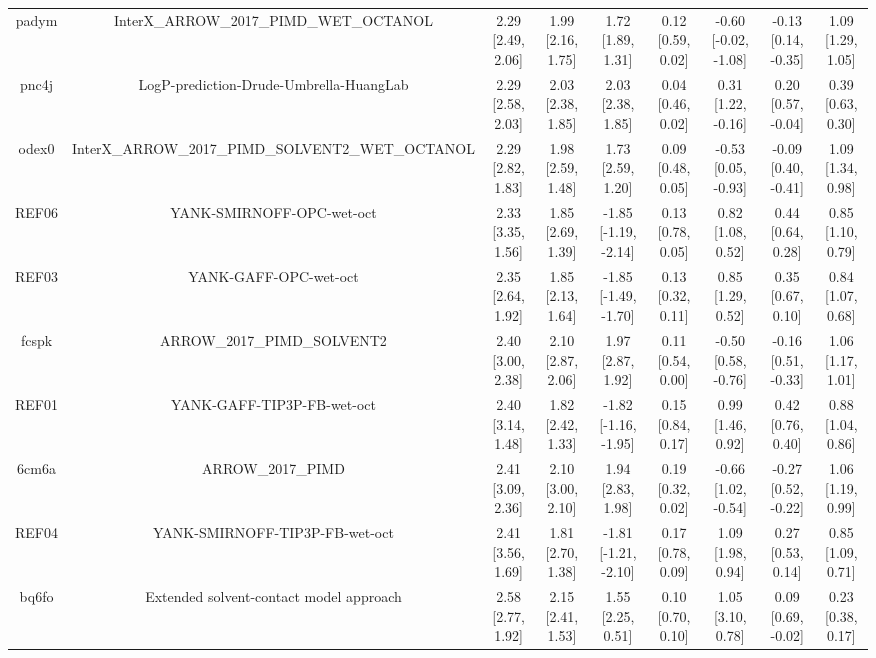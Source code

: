 \documentclass{article}
\begin{document}
\begin{center}
\begin{longtable}{|ccccccccc|}
 padym &            InterX\_ARROW\_2017\_PIMD\_WET\_OCTANOL &  2.29 [2.49, 2.06] &  1.99 [2.16, 1.75] &     1.72 [1.89, 1.31] &  0.12 [0.59, 0.02] &  -0.60 [-0.02, -1.08] &   -0.13 [0.14, -0.35] &     1.09 [1.29, 1.05] \\
 pnc4j &            LogP-prediction-Drude-Umbrella-HuangLab &  2.29 [2.58, 2.03] &  2.03 [2.38, 1.85] &     2.03 [2.38, 1.85] &  0.04 [0.46, 0.02] &    0.31 [1.22, -0.16] &    0.20 [0.57, -0.04] &     0.39 [0.63, 0.30] \\
 odex0 &  InterX\_ARROW\_2017\_PIMD\_SOLVENT2\_WET\_OCTANOL &  2.29 [2.82, 1.83] &  1.98 [2.59, 1.48] &     1.73 [2.59, 1.20] &  0.09 [0.48, 0.05] &   -0.53 [0.05, -0.93] &   -0.09 [0.40, -0.41] &     1.09 [1.34, 0.98] \\
 REF06 &                          YANK-SMIRNOFF-OPC-wet-oct &  2.33 [3.35, 1.56] &  1.85 [2.69, 1.39] &  -1.85 [-1.19, -2.14] &  0.13 [0.78, 0.05] &     0.82 [1.08, 0.52] &     0.44 [0.64, 0.28] &     0.85 [1.10, 0.79] \\
 REF03 &                              YANK-GAFF-OPC-wet-oct &  2.35 [2.64, 1.92] &  1.85 [2.13, 1.64] &  -1.85 [-1.49, -1.70] &  0.13 [0.32, 0.11] &     0.85 [1.29, 0.52] &     0.35 [0.67, 0.10] &     0.84 [1.07, 0.68] \\
 fcspk &                        ARROW\_2017\_PIMD\_SOLVENT2 &  2.40 [3.00, 2.38] &  2.10 [2.87, 2.06] &     1.97 [2.87, 1.92] &  0.11 [0.54, 0.00] &   -0.50 [0.58, -0.76] &   -0.16 [0.51, -0.33] &     1.06 [1.17, 1.01] \\
 REF01 &                         YANK-GAFF-TIP3P-FB-wet-oct &  2.40 [3.14, 1.48] &  1.82 [2.42, 1.33] &  -1.82 [-1.16, -1.95] &  0.15 [0.84, 0.17] &     0.99 [1.46, 0.92] &     0.42 [0.76, 0.40] &     0.88 [1.04, 0.86] \\
 6cm6a &                                  ARROW\_2017\_PIMD &  2.41 [3.09, 2.36] &  2.10 [3.00, 2.10] &     1.94 [2.83, 1.98] &  0.19 [0.32, 0.02] &   -0.66 [1.02, -0.54] &   -0.27 [0.52, -0.22] &     1.06 [1.19, 0.99] \\
 REF04 &                     YANK-SMIRNOFF-TIP3P-FB-wet-oct &  2.41 [3.56, 1.69] &  1.81 [2.70, 1.38] &  -1.81 [-1.21, -2.10] &  0.17 [0.78, 0.09] &     1.09 [1.98, 0.94] &     0.27 [0.53, 0.14] &     0.85 [1.09, 0.71] \\
 bq6fo &            Extended solvent-contact model approach &  2.58 [2.77, 1.92] &  2.15 [2.41, 1.53] &     1.55 [2.25, 0.51] &  0.10 [0.70, 0.10] &     1.05 [3.10, 0.78] &    0.09 [0.69, -0.02] &     0.23 [0.38, 0.17] \\

\end{longtable}
\end{center}
\end{document}
